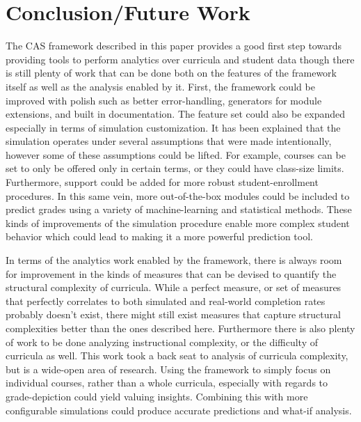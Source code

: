 \documentclass[botnum, fleqn]{unmeethesis}
\begin{document}



\chapter{Conclusion/Future Work}
  The CAS framework described in this paper provides a good first step towards providing tools to perform analytics over curricula and student data though there is still plenty of work that can be done both on the features of the framework itself as well as the analysis enabled by it. First, the framework could be improved with polish such as better error-handling, generators for module extensions, and built in documentation. The feature set could also be expanded especially in terms of simulation customization. It has been explained that the simulation operates under several assumptions that were made intentionally, however some of these assumptions could be lifted. For example, courses can be set to only be offered only in certain terms, or they could have class-size limits. Furthermore, support could be added for more robust student-enrollment procedures. In this same vein, more out-of-the-box modules could be included to predict grades using a variety of machine-learning and statistical methods. These kinds of improvements of the simulation procedure enable more complex student behavior which could lead to making it a more powerful prediction tool.

  In terms of the analytics work enabled by the framework, there is always room for improvement in the kinds of measures that can be devised to quantify the structural complexity of curricula. While a perfect measure, or set of measures that perfectly correlates to both simulated and real-world completion rates probably doesn't exist, there might still exist measures that capture structural complexities better than the ones described here. Furthermore there is also plenty of work to be done analyzing instructional complexity, or the difficulty of curricula as well. This work took a back seat to analysis of curricula complexity, but is a wide-open area of research. Using the framework to simply focus on individual courses, rather than a whole curricula, especially with regards to grade-depiction could yield valuing insights. Combining this with more configurable simulations could produce accurate predictions and what-if analysis.
\end{document}
